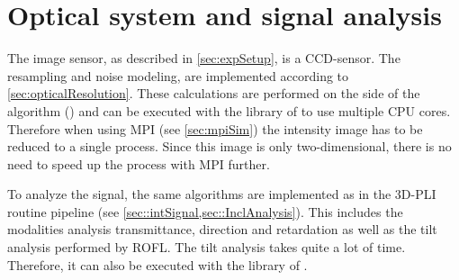 \section{Optical system and signal analysis}
\label{sec:ccdOptic}
%
The image sensor, as described in \cref{sec:expSetup}, is a \ac{CCD}-sensor.
The resampling and noise modeling, are implemented according to \cref{sec:opticalResolution}.
These calculations are performed on the \python{} side of the algorithm () and can be executed with the  library of \python{} to use multiple \ac{CPU} cores.
Therefore when using \ac{MPI} (see \cref{sec:mpiSim}) the intensity image has to be reduced to a single process.
Since this image is only two-dimensional, there is no need to speed up the process with \ac{MPI} further.
\par
%
To analyze the signal, the same algorithms are implemented as in the \ac{3D-PLI} routine pipeline (see \cref{sec::intSignal,sec::InclAnalysis}).
This includes the modalities analysis transmittance, direction and retardation as well as the tilt analysis performed by \ac{ROFL}.
The tilt analysis takes quite a lot of time.
Therefore, it can also be executed with the  library of \python{}.
%
%
%
